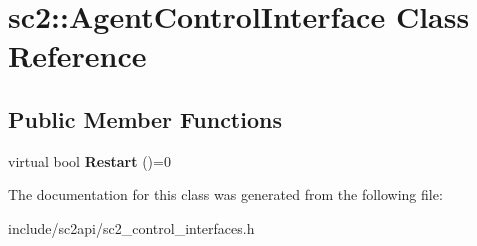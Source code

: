 \hypertarget{classsc2_1_1_agent_control_interface}{}\section{sc2\+:\+:Agent\+Control\+Interface Class Reference}
\label{classsc2_1_1_agent_control_interface}
\subsection*{Public Member Functions}
\begin{DoxyCompactItemize}
\item 
\mbox{\label{classsc2_1_1_agent_control_interface_aee80a32163dfe91c5aac55e6f00f304d}} 
virtual bool {\bfseries Restart} ()=0
\end{DoxyCompactItemize}


The documentation for this class was generated from the following file\+:\begin{DoxyCompactItemize}
\item 
include/sc2api/sc2\+\_\+control\+\_\+interfaces.\+h\end{DoxyCompactItemize}
